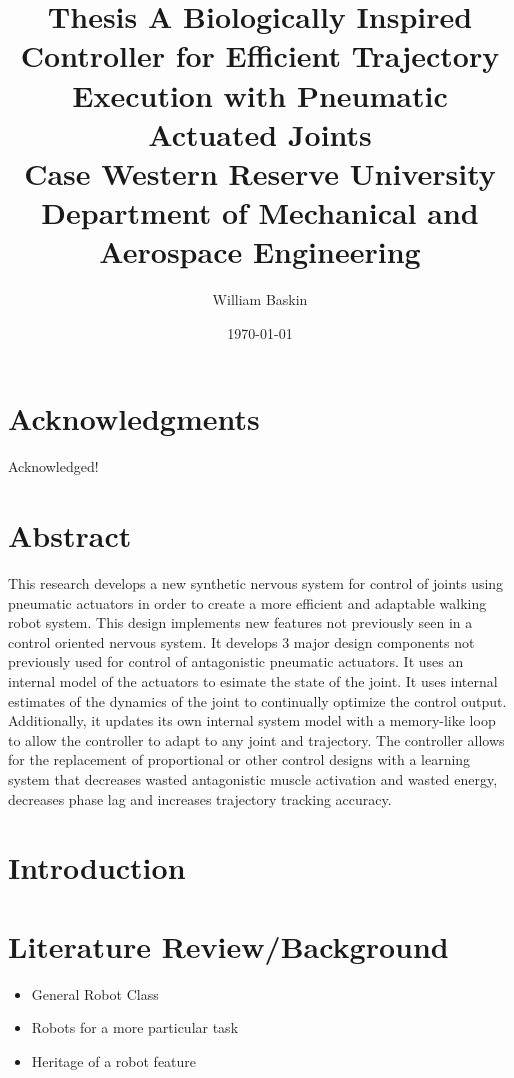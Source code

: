 \documentclass[12pt, letterpaper, oneside, onecolumn]{report} %
\author{William Baskin}
\title{Thesis}
\title{
  {A Biologically Inspired Controller for Efficient Trajectory Execution with Pneumatic Actuated Joints}\\
  {\large Case Western Reserve University \\
  Department of Mechanical and Aerospace Engineering}%
}
\date{\today}
\begin{document}
\maketitle


\tableofcontents

\listoffigures

\chapter*{Acknowledgments}
Acknowledged!

\chapter*{Abstract}
This research develops a new synthetic nervous system for control of joints using pneumatic actuators in order to create a more efficient and adaptable walking robot system. This design implements new features not previously seen in a control oriented nervous system. It develops 3 major design components not previously used for control of antagonistic pneumatic actuators. It uses an internal model of the actuators to esimate the state of the joint. It uses internal estimates of the dynamics of the joint to continually optimize the control output. Additionally, it updates its own internal system model with a memory-like loop to allow the controller to adapt to any joint and trajectory. The controller allows for the replacement of proportional or other control designs with a learning system that decreases wasted antagonistic muscle activation and wasted energy, decreases phase lag and increases trajectory tracking accuracy.

\chapter{Introduction}


\chapter{Literature Review/Background}
\begin{itemize}
\item General Robot Class
\item Robots for a more particular task
\item Heritage of a robot feature
\end{itemize}

\end{document}
